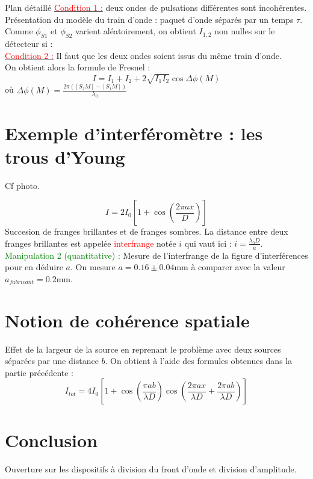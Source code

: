 \begin{reportBlock}{Plan détaillé}
  \underline{\textcolor{red}{Condition 1 :}} deux ondes de pulsations différentes sont incohérentes.\\

  Présentation du modèle du train d'onde : paquet d'onde séparés par un temps $\tau$. Comme $\phi_{S1}$ et $\phi_{S2}$ varient aléatoirement, on obtient $I_{1,2}$ non nulles sur le détecteur si :\\
  \underline{\textcolor{red}{Condition 2 :}} Il faut que les deux ondes soient issus du même train d'onde. \\

  On obtient alors la formule de Fresnel :
  \begin{equation}
      I = I_1 + I_2 + 2\sqrt{I_1I_2}\cos{\Delta\phi(M)}  \end{equation}
      où $\Delta\phi(M) = \frac{2\pi([S_2M]-[S_1M])}{\lambda_0}$

\section{Exemple d'interféromètre : les trous d'Young}
Cf photo.

\begin{equation}
    I = 2I_0\left[1+\cos\left(\frac{2\pi ax}{D}\right)\right]
\end{equation}
Succesion de franges brillantes et de franges sombres. La distance entre deux franges brillantes est appelée \textcolor{red}{interfrange} notée $i$ qui vaut ici : $i=\frac{\lambda_0D}{a}$.\\
\textcolor{green}{Manipulation 2 (quantitative) :} Mesure de l'interfrange de la figure d'interférences pour en déduire $a$. On mesure $a=0.16\pm0.04$mm à comparer avec la valeur $a_{fabricant}=0.2$mm.

\section{Notion de cohérence spatiale}
Effet de la largeur de la source en reprenant le problème avec deux sources séparées par une distance $b$. On obtient à l'aide des formules obtenues dans la partie précédente : 
\begin{equation}
    I_{tot} = 4I_0\left[1+\cos\left(\frac{\pi ab}{\lambda D}\right)\cos\left(\frac{2\pi a x}{\lambda D}+\frac{2\pi a b}{\lambda D}\right)\right]
\end{equation}
\section{Conclusion}
Ouverture sur les dispositifs à division du front d'onde et division d'amplitude.
\end{reportBlock}


